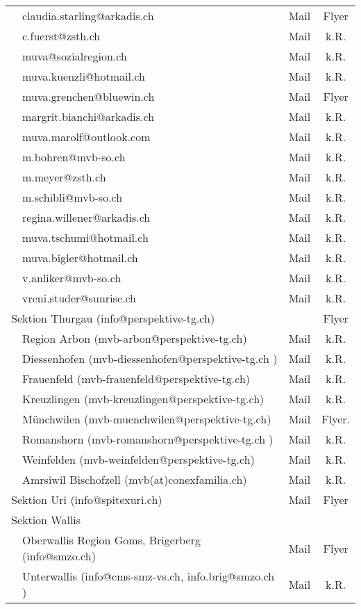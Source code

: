\begin{longtable}[htbp]{|p{0.2em} p{20em} | c | c |}
  & claudia.starling@arkadis.ch & Mail & Flyer\\
  & c.fuerst@zsth.ch & Mail & k.R.\\
  & muva@sozialregion.ch & Mail & k.R.\\
  & muva.kuenzli@hotmail.ch & Mail & k.R.\\
  & muva.grenchen@bluewin.ch & Mail & Flyer\\
  & margrit.bianchi@arkadis.ch & Mail & k.R.\\
  & muva.marolf@outlook.com & Mail & k.R.\\
  & m.bohren@mvb-so.ch & Mail & k.R.\\
  & m.meyer@zsth.ch & Mail & k.R.\\
  & m.schibli@mvb-so.ch & Mail & k.R.\\
  & regina.willener@arkadis.ch & Mail & k.R.\\
  & muva.tschumi@hotmail.ch & Mail & k.R.\\
  & muva.bigler@hotmail.ch & Mail & k.R.\\
  & v.anliker@mvb-so.ch & Mail & k.R.\\
  & vreni.studer@sunrise.ch  & Mail & k.R.\\
  \multicolumn{2}{|l|}{Sektion Thurgau (info@perspektive-tg.ch)} &  & Flyer\\
  & Region Arbon (mvb-arbon@perspektive-tg.ch) & Mail & k.R.\\
  & Diessenhofen (mvb-diessenhofen@perspektive-tg.ch ) & Mail & k.R.\\
  & Frauenfeld (mvb-frauenfeld@perspektive-tg.ch) & Mail & k.R.\\
  & Kreuzlingen (mvb-kreuzlingen@perspektive-tg.ch) & Mail & k.R.\\
  & Münchwilen (mvb-muenchwilen@perspektive-tg.ch) & Mail & Flyer.\\
  & Romanshorn (mvb-romanshorn@perspektive-tg.ch ) & Mail & k.R.\\
  & Weinfelden (mvb-weinfelden@perspektive-tg.ch) & Mail & k.R.\\
  & Amrsiwil Bischofzell (mvb(at)conexfamilia.ch) & Mail & k.R.\\
  \multicolumn{2}{|l|}{Sektion Uri (info@spitexuri.ch)} & Mail & Flyer\\
  \multicolumn{2}{|l|}{Sektion Wallis} & &\\
  & Oberwallis Region Goms, Brigerberg (info@smzo.ch) & Mail & Flyer\\
  & Unterwallis (info@cms-smz-vs.ch, info.brig@smzo.ch ) & Mail & k.R.\\

\end{longtable}
